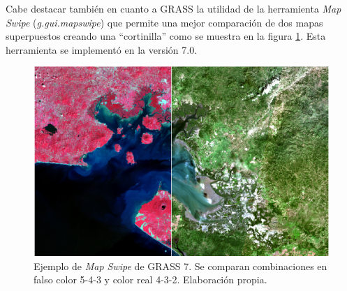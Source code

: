 Cabe destacar también en cuanto a GRASS la utilidad de la herramienta \textit{Map Swipe} (\textit{g.gui.mapswipe}) que permite una mejor comparación de dos mapas superpuestos creando una ``cortinilla'' como se muestra en la figura \ref{fig:map_swipe}. Esta herramienta se implementó en la versión 7.0.

\begin{figure}
	\centering
	\includegraphics[width=0.9\linewidth]{./Imagenes/Map_swipe.eps}
	\caption[\textit{Map Swipe} de GRASS 7]{Ejemplo de \textit{Map Swipe} de GRASS 7. Se comparan combinaciones en falso color 5-4-3 y color real 4-3-2. Elaboración propia.}
	\label{fig:map_swipe}
\end{figure}
